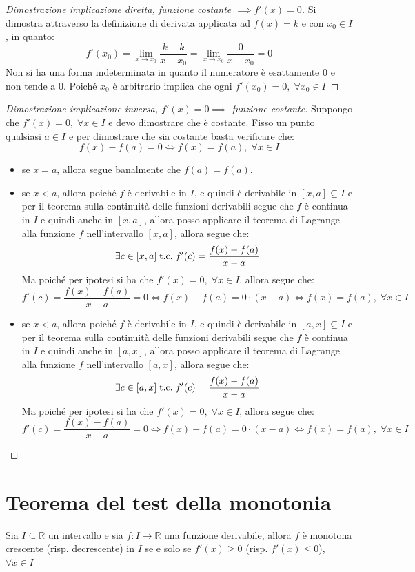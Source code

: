 \documentclass[a4paper,12pt,openright]{book}
\begin{document}
	\begin{proof}[Dimostrazione implicazione diretta, funzione costante $\implies f'(x) = 0$]
		Si dimostra attraverso la definizione di derivata applicata ad $f(x) = k$ e con $x_0 \in I$, in quanto:
		\[f'(x_0) = \lim_{x \rightarrow x_0} \frac{k - k}{x - x_0} = \lim_{x \rightarrow x_0} \frac{0}{x - x_0} = 0\]
		Non si ha una forma indeterminata in quanto il numeratore è esattamente 0 e non tende a 0. Poiché $x_0$ è arbitrario implica che ogni $f'(x_0) = 0, \; \forall x_0 \in I$ 
	\end{proof}
	\begin{proof}[Dimostrazione implicazione inversa, $f'(x) = 0 \implies$ funzione costante]
		Suppongo che $f'(x) = 0, \; \forall x \in I$ e devo dimostrare che è costante. Fisso un punto qualsiasi $a \in I$ e per dimostrare che sia costante basta verificare che:
		\[f(x) - f(a) = 0 \iff f(x) = f(a), \; \forall x \in I\]
		\begin{itemize}
			\item se $x = a$, allora segue banalmente che $f(a) = f(a)$.
			\item se $x < a$, allora poiché $f$ è derivabile in $I$, e quindi è derivabile in $[x, a] \subseteq I$ e per il teorema sulla continuità delle funzioni derivabili segue che $f$ è continua in $I$ e quindi anche in $[x, a]$, allora posso applicare il teorema di Lagrange alla funzione $f$ nell'intervallo $[x, a]$, allora segue che:
			\[\exists c \in [x, a] \;\text{t.c.}\; f'(c) = \frac{f(x) - f(a)}{x - a}\]
			Ma poiché per ipotesi si ha che $f'(x) = 0, \; \forall x \in I$, allora segue che:
			\[f'(c) = \frac{f(x) - f(a)}{x - a} = 0 \iff f(x) - f(a) = 0 \cdot (x - a) \iff f(x) = f(a),\; \forall x \in I\]
			\item se $x < a$, allora poiché $f$ è derivabile in $I$, e quindi è derivabile in $[a, x] \subseteq I$ e per il teorema sulla continuità delle funzioni derivabili segue che $f$ è continua in $I$ e quindi anche in $[a, x]$, allora posso applicare il teorema di Lagrange alla funzione $f$ nell'intervallo $[a, x]$, allora segue che:
			\[\exists c \in [a, x] \;\text{t.c.}\; f'(c) = \frac{f(x) - f(a)}{x - a}\]
			Ma poiché per ipotesi si ha che $f'(x) = 0, \; \forall x \in I$, allora segue che:
			\[f'(c) = \frac{f(x) - f(a)}{x - a} = 0 \iff f(x) - f(a) = 0 \cdot (x - a) \iff f(x) = f(a),\; \forall x \in I\]
		\end{itemize}
	\end{proof}
	
	\section{Teorema del test della monotonia}
	Sia $I \subseteq \mathbb{R}$ un intervallo e sia $f: I \longrightarrow \mathbb{R}$ una funzione derivabile, allora $f$ è monotona crescente (risp. decrescente) in $I$ se e solo se $f'(x) \geq 0$ (risp. $f'(x) \leq 0$), $\forall x \in I$
	
\end{document}
